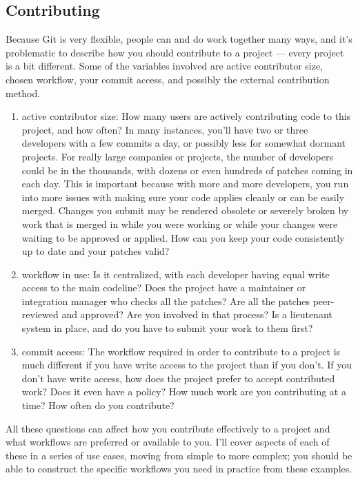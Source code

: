 \documentclass[draftclsnofoot,journal,onecolumn,12pt]{IEEEtran}
\begin{document}
\subsection{Contributing}
Because Git is very flexible, people can and do work together many ways, and it’s problematic to describe how you should contribute to a project — every project is a bit different. Some of the variables involved are active contributor size, chosen workflow, your commit access, and possibly the external contribution method.
\begin{enumerate}
  \item active contributor size: How many users are actively contributing code to this project, and how often? In many instances, you’ll have two or three developers with a few commits a day, or possibly less for somewhat dormant projects. For really large companies or projects, the number of developers could be in the thousands, with dozens or even hundreds of patches coming in each day. This is important because with more and more developers, you run into more issues with making sure your code applies cleanly or can be easily merged. Changes you submit may be rendered obsolete or severely broken by work that is merged in while you were working or while your changes were waiting to be approved or applied. How can you keep your code consistently up to date and your patches valid?
  \item workflow in use: Is it centralized, with each developer having equal write access to the main codeline? Does the project have a maintainer or integration manager who checks all the patches? Are all the patches peer-reviewed and approved? Are you involved in that process? Is a lieutenant system in place, and do you have to submit your work to them first?
  \item commit access: The workflow required in order to contribute to a project is much different if you have write access to the project than if you don’t. If you don’t have write access, how does the project prefer to accept contributed work? Does it even have a policy? How much work are you contributing at a time? How often do you contribute?
\end{enumerate}

All these questions can affect how you contribute effectively to a project and what workflows are preferred or available to you. I’ll cover aspects of each of these in a series of use cases, moving from simple to more complex; you should be able to construct the specific workflows you need in practice from these examples.
\end{document}
